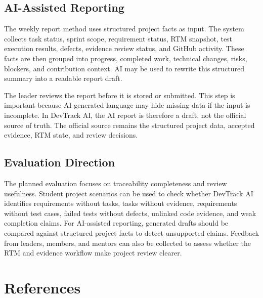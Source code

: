 \documentclass[runningheads]{llncs}
\begin{document}
\subsection{AI-Assisted Reporting}

The weekly report method uses structured project facts as input. The system collects
task status, sprint scope, requirement status, RTM snapshot, test execution results,
defects, evidence review status, and GitHub activity. These facts are then grouped
into progress, completed work, technical changes, risks, blockers, and contribution
context. AI may be used to rewrite this structured summary into a readable report
draft.

The leader reviews the report before it is stored or submitted. This step is
important because AI-generated language may hide missing data if the input is
incomplete. In DevTrack AI, the AI report is therefore a draft, not the official
source of truth. The official source remains the structured project data, accepted
evidence, RTM state, and review decisions.

\subsection{Evaluation Direction}

The planned evaluation focuses on traceability completeness and review usefulness.
Student project scenarios can be used to check whether DevTrack AI identifies
requirements without tasks, tasks without evidence, requirements without test cases,
failed tests without defects, unlinked code evidence, and weak completion claims. For
AI-assisted reporting, generated drafts should be compared against structured project
facts to detect unsupported claims. Feedback from leaders, members, and mentors can
also be collected to assess whether the RTM and evidence workflow make project
review clearer.

\section{References}
\end{document}
